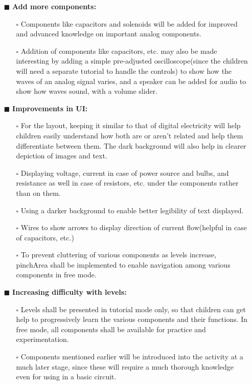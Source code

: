 \documentclass[preprint,12pt]{elsarticle}
\begin{document}
\begin{itemize}
		\item[$\blacksquare$] \textbf{Add more components:}
			
			\begin{itemize}
			\item[$\square$] {Components like capacitors and solenoids will be added for improved and advanced knowledge on important analog components.}
			
			\item[$\square$] {Addition of components like capacitors, etc. may also be made interesting by adding a simple pre-adjusted oscilloscope(since the children will need a separate tutorial to handle the controls) to show how the waves of an analog signal varies, and a speaker can be added for audio to show how waves sound, with a volume slider.}
			\end{itemize}
			
		\item[$\blacksquare$] \textbf{Improvements in UI:}
			\begin{itemize}
			\item[$\square$] {For the layout, keeping it similar to that of digital electricity will help children easily understand how both are or aren’t related and help them differentiate between them. The dark background will also help in clearer depiction of images and text.}
			\item[$\square$] {Displaying voltage, current in case of power source and bulbs, and resistance as well in case of resistors, etc. under the components rather than on them.}
			
			\item[$\square$] {Using a darker background to enable better legibility of text displayed.}
			
			\item[$\square$] {Wires to show arrows to display direction of current flow(helpful in case of capacitors, etc.)}
			
			\item[$\square$] {To prevent cluttering of various components as levels increase, pinchArea shall be implemented to enable navigation among various components in free mode.}\\
			\end{itemize}
			
		\item[$\blacksquare$] \textbf{Increasing difficulty with levels:}
			\begin{itemize}
			\item[$\square$] {Levels shall be presented in tutorial mode only, so that children can get help to progressively learn the various components and their functions. In free mode, all components shall be available for practice and experimentation.}
			
			\item[$\square$] {Components mentioned earlier will be introduced into the activity at a much later stage, since these will require a much thorough knowledge even for using in a basic circuit.}
			\end{itemize}
		\end{itemize}
\bigskip\bigskip
\end{document}
